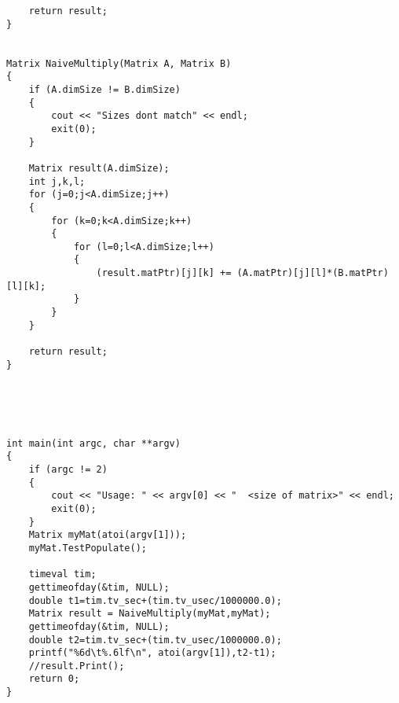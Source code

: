 \documentclass[a4paper]{article}
\begin{document}
\begin{lstlisting}
    return result;
}


Matrix NaiveMultiply(Matrix A, Matrix B)
{
    if (A.dimSize != B.dimSize)
    {
        cout << "Sizes dont match" << endl;
        exit(0);
    }

    Matrix result(A.dimSize);
    int j,k,l;
    for (j=0;j<A.dimSize;j++)
    {
        for (k=0;k<A.dimSize;k++)
        {
            for (l=0;l<A.dimSize;l++)
            {
                (result.matPtr)[j][k] += (A.matPtr)[j][l]*(B.matPtr)[l][k];
            }    
        }
    } 

    return result;
}





int main(int argc, char **argv)
{
    if (argc != 2)
    {
        cout << "Usage: " << argv[0] << "  <size of matrix>" << endl;
        exit(0);
    }
    Matrix myMat(atoi(argv[1]));
    myMat.TestPopulate();
    
    timeval tim;
    gettimeofday(&tim, NULL);
    double t1=tim.tv_sec+(tim.tv_usec/1000000.0);
    Matrix result = NaiveMultiply(myMat,myMat);
    gettimeofday(&tim, NULL);
    double t2=tim.tv_sec+(tim.tv_usec/1000000.0);
    printf("%6d\t%.6lf\n", atoi(argv[1]),t2-t1);
    //result.Print();
    return 0;
}
\end{lstlisting}
\end{document}
